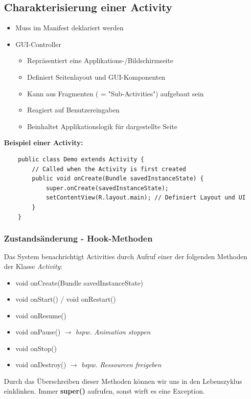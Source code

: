 \documentclass[a4paper]{article}
\begin{document}
	\subsection{Charakterisierung einer Activity}
	\begin{itemize}
		\item Muss im Manifest deklariert werden
		\item GUI-Controller
		\begin{itemize}
			\item Repräsentiert eine Applikations-/Bildschirmseite
			\item Definiert Seitenlayout und GUI-Komponenten
			\item Kann aus Fragmenten ( = "Sub-Activities") aufgebaut sein
			\item Reagiert auf Benutzereingaben
			\item Beinhaltet Applikationslogik für dargestellte Seite
		\end{itemize}
	\end{itemize}
	\textbf{Beispiel einer Activity:}
	\begin{lstlisting}
	public class Demo extends Activity {
		// Called when the Activity is first created
		public void onCreate(Bundle savedInstanceState) {
			super.onCreate(savedInstanceState);
			setContentView(R.layout.main); // Definiert Layout und UI
		} 
	}	
	\end{lstlisting}
	\subsubsection{Zustandsänderung - Hook-Methoden}
	Das System benachrichtigt Activities durch Aufruf einer der folgenden Methoden der Klasse \textit{Activity}:
	\begin{itemize}
		\item void onCreate(Bundle savedInstanceState)
		\item void onStart() / void onRestart()
		\item void onResume()
		\item void onPause() $\rightarrow$ \textit{bspw. Animation stoppen}
		\item void onStop()
		\item void onDestroy() $\rightarrow$ \textit{bspw. Ressourcen freigeben}
	\end{itemize}
	Durch das Überschreiben dieser Methoden können wir uns in den Lebenszyklus einklinken. Immer \textbf{super()} aufrufen, sonst wirft es eine Exception.
	\newpage
\end{document}
